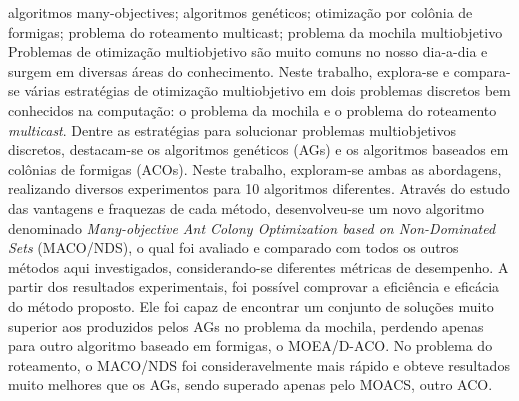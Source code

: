 \documentclass[dissertmst]{ppgco}
\begin{document}
\begin{resumo}{algoritmos many-objectives; algoritmos genéticos; otimização por colônia de formigas; problema do roteamento multicast; problema da mochila multiobjetivo}
	Problemas de otimização multiobjetivo são muito comuns no nosso dia-a-dia e surgem em diversas áreas do conhecimento. Neste trabalho, explora-se e compara-se várias estratégias de otimização multiobjetivo em dois problemas discretos bem conhecidos na computação: o problema da mochila e o problema do roteamento \textit{multicast}. Dentre as estratégias para solucionar problemas multiobjetivos discretos, destacam-se os algoritmos genéticos (AGs) e os algoritmos baseados em colônias de formigas (ACOs). Neste trabalho, exploram-se ambas as abordagens, realizando diversos experimentos para 10 algoritmos diferentes. Através do estudo das vantagens e fraquezas de cada método, desenvolveu-se um novo algoritmo denominado \textit{Many-objective Ant Colony Optimization based on Non-Dominated Sets} (MACO/NDS), o qual foi avaliado e comparado com todos os outros métodos aqui investigados, considerando-se diferentes métricas de desempenho. A partir dos resultados experimentais, foi possível comprovar a eficiência e eficácia do método proposto. Ele foi capaz de encontrar um conjunto de soluções muito superior aos produzidos pelos AGs no problema da mochila, perdendo apenas para outro algoritmo baseado em formigas, o MOEA/D-ACO. No problema do roteamento, o MACO/NDS foi consideravelmente mais rápido e obteve resultados muito melhores que os AGs, sendo superado apenas pelo MOACS, outro ACO.
\end{resumo}

\begin{abstract}{many-objective algorithms; genetic algorithms; ant colony optimization; multicast routing problem; multi-objective knapsack problem}
	Multi-objective optimization problems are very common in the day-to-day life and come up in many fields of knowledge. In this work, several strategies for multi-objective optimization have been explored and compared in two well known discrete problems in computer science: the knapsack problem and the multicast routing problem. Among all strategies to solve multi-objective discrete problems, genetic algorithms (GAs) and ant colony optimization (ACO) are the ones who generally provide the best results. In this work both approaches are explored through several experiments involving 10 different algorithms. As a consequence of studying the strengths and weaknesses of each method, a new algorithm has been proposed, the Many-objective Ant Colony Optimization based on Non-Dominated Sets (MACO/NDS), which has been evaluated and compared against all other methods investigated here, considering different performance metrics. It has been capable of finding much superior sets of solutions than the ones yielded by the GAs in the knapsack problem, losing only to another algorithm based on ant colonies, the MOEA/D-ACO. In the routing problem, MACO/NDS was considerably faster and obtained much better results than any GA, being surpassed only by MOACS, another ACO.
\end{abstract}
\end{document}
